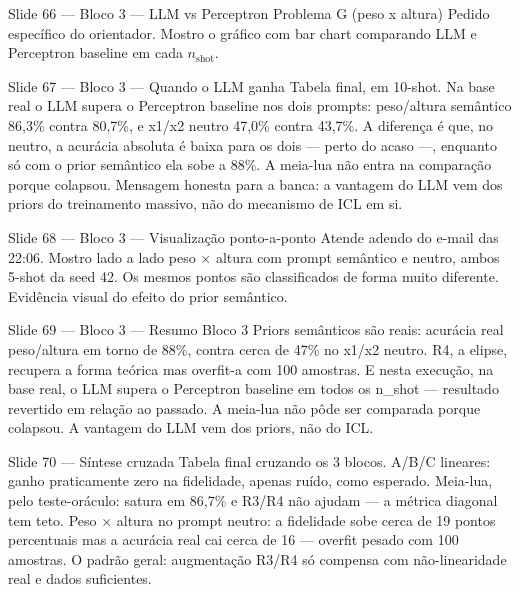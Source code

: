 \documentclass[aspectratio=169,10pt]{beamer}
\begin{document}
\begin{frame}{Slide 66 --- Bloco 3 --- LLM vs Perceptron Problema G (peso x altura)}
\footnotesize
Pedido espec\'ifico do orientador. Mostro o gr\'afico com bar chart comparando LLM e Perceptron baseline em cada $n_{\text{shot}}$.
\end{frame}

\begin{frame}{Slide 67 --- Bloco 3 --- Quando o LLM ganha}
\footnotesize
Tabela final, em 10-shot. Na base real o LLM supera o Perceptron baseline nos dois prompts: peso/altura sem\^antico 86,3\% contra 80,7\%, e x1/x2 neutro 47,0\% contra 43,7\%. A diferen\c{c}a \'e que, no neutro, a acur\'acia absoluta \'e baixa para os dois --- perto do acaso ---, enquanto s\'o com o prior sem\^antico ela sobe a 88\%. A meia-lua n\~ao entra na compara\c{c}\~ao porque colapsou. Mensagem honesta para a banca: a vantagem do LLM vem dos priors do treinamento massivo, n\~ao do mecanismo de ICL em si.
\end{frame}

\begin{frame}{Slide 68 --- Bloco 3 --- Visualiza\c{c}\~ao ponto-a-ponto}
\footnotesize
Atende adendo do e-mail das 22:06. Mostro lado a lado peso $\times$ altura com prompt sem\^antico e neutro, ambos 5-shot da seed 42. Os mesmos pontos s\~ao classificados de forma muito diferente. Evid\^encia visual do efeito do prior sem\^antico.
\end{frame}

\begin{frame}{Slide 69 --- Bloco 3 --- Resumo Bloco 3}
\footnotesize
Priors sem\^anticos s\~ao reais: acur\'acia real peso/altura em torno de 88\%, contra cerca de 47\% no x1/x2 neutro. R4, a elipse, recupera a forma te\'orica mas overfit-a com 100 amostras. E nesta execu\c{c}\~ao, na base real, o LLM supera o Perceptron baseline em todos os n\_shot --- resultado revertido em rela\c{c}\~ao ao passado. A meia-lua n\~ao p\^ode ser comparada porque colapsou. A vantagem do LLM vem dos priors, n\~ao do ICL.
\end{frame}

\begin{frame}{Slide 70 --- S\'intese cruzada}
\footnotesize
Tabela final cruzando os 3 blocos. A/B/C lineares: ganho praticamente zero na fidelidade, apenas ru\'ido, como esperado. Meia-lua, pelo teste-or\'aculo: satura em 86,7\% e R3/R4 n\~ao ajudam --- a m\'etrica diagonal tem teto. Peso $\times$ altura no prompt neutro: a fidelidade sobe cerca de 19 pontos percentuais mas a acur\'acia real cai cerca de 16 --- overfit pesado com 100 amostras. O padr\~ao geral: augmenta\c{c}\~ao R3/R4 s\'o compensa com n\~ao-linearidade real e dados suficientes.
\end{frame}
\end{document}
